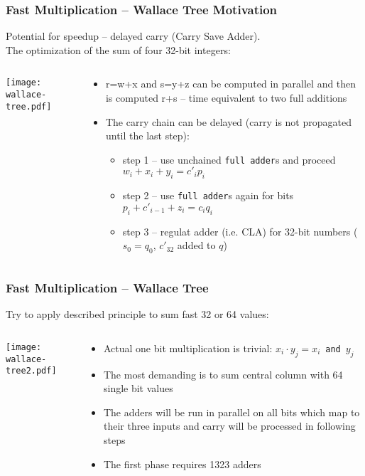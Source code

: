 \documentclass{beamer}
\begin{document}
\begin{frame}
\frametitle{Fast Multiplication -- Wallace Tree Motivation}

Potential for speedup -- delayed carry (Carry Save Adder).\\
The optimization of the sum of four 32-bit integers:\\
\begin{columns}
\begin{column}{0.35\textwidth}
\texttt{[image: wallace-tree.pdf]}
\end{column}
\hfill
\begin{column}{0.65\textwidth}
\begin{itemize}
\item r=w+x and s=y+z can be computed in parallel and then is computed r+s -- time equivalent to two full additions
\item The carry chain can be delayed (carry is not propagated until the last step):
\begin{itemize}
\item step 1 -- use unchained \texttt{full adder}s and proceed $w_i+x_i+y_i = c'_ip_i$
\item step 2 -- use \texttt{full adder}s again for bits $p_i+c'_{i-1}+z_i = c_iq_i$
\item step 3 -- regulat adder (i.e. CLA) for 32-bit numbers ($s_0=q_0$, $c'_32$ added to $q$)
\end{itemize}
\end{itemize}
\end{column}
\end{columns}
\end{frame}


\begin{frame}
\frametitle{Fast Multiplication -- Wallace Tree}

Try to apply described principle to sum fast 32 or 64 values:
\begin{columns}
\begin{column}{0.6\textwidth}
\texttt{[image: wallace-tree2.pdf]}
\end{column}
\hfill
\begin{column}{0.4\textwidth}
\begin{itemize}
\item Actual one bit multiplication is trivial: $x_i \cdot y_j=x_i$~\texttt{and}~$y_j$
\item The most demanding is to sum central column with 64 single bit values
\item The adders will be run in parallel on all bits which map to their three inputs and carry will be processed in following steps
\item The first phase requires 1323 adders
\end{itemize}
\end{column}
\end{columns}

\end{frame}
\end{document}
